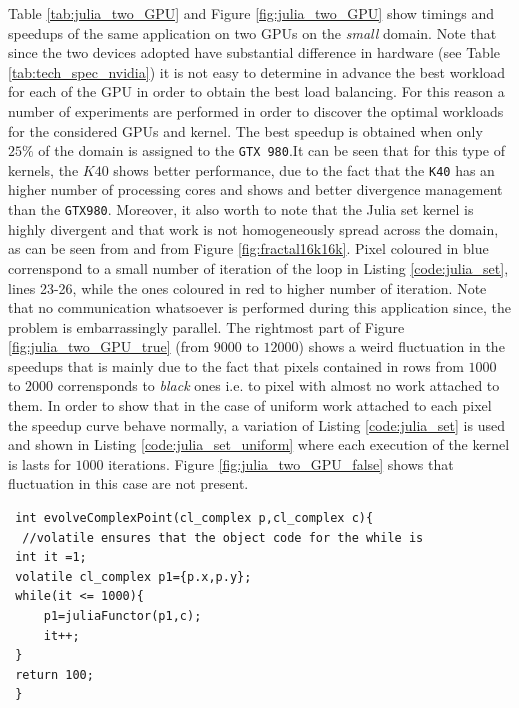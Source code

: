 Table \ref{tab:julia_two_GPU} and Figure \ref{fig:julia_two_GPU} show timings and speedups of the same application on two GPUs on the \textit{small} domain. Note that since the two devices adopted have substantial difference in hardware (see Table \ref{tab:tech_spec_nvidia}) it is not easy to determine in advance the best workload for each of the GPU in order to obtain the best load balancing. For this reason a number of experiments are performed in order to discover the optimal workloads for the considered GPUs and kernel.
The best speedup is obtained when only $25\%$ of the domain is assigned to the \texttt{GTX 980}.It can be seen that for this type of kernels, the $K40$ shows better performance, due to the fact that the \texttt{K40} has an higher number of processing cores and shows and better divergence management than the \texttt{GTX980}.
Moreover, it also worth to note that the Julia set kernel is highly divergent and that work is not homogeneously spread across the domain, as can be seen from  and from Figure \ref{fig:fractal16k16k}. Pixel coloured in blue correnspond to a small number of iteration of the loop in Listing \ref{code:julia_set}, lines 23-26, while the ones coloured in red to higher number of iteration.
Note that no communication whatsoever is performed during this application since, the problem is embarrassingly parallel.
The rightmost part of Figure \ref{fig:julia_two_GPU_true} (from $9000$ to $12000$) shows a weird fluctuation in the speedups that is mainly due to the fact that pixels contained in rows from $1000$ to $2000$ corrensponds to \textit{black} ones i.e. to pixel with almost no work attached to them.
In order to show that in the case of uniform work attached to each pixel the speedup curve behave normally, a variation of Listing \ref{code:julia_set} is used and shown in Listing \ref{code:julia_set_uniform} where each execution of the kernel is lasts for $1000$ iterations.
Figure \ref{fig:julia_two_GPU_false} shows that fluctuation in this case are not present.

 \begin{lstlisting}
 int evolveComplexPoint(cl_complex p,cl_complex c){
  //volatile ensures that the object code for the while is 
 int it =1;
 volatile cl_complex p1={p.x,p.y};
 while(it <= 1000){
	 p1=juliaFunctor(p1,c);
	 it++;
 }
 return 100;
 }
 \end{lstlisting}
 
